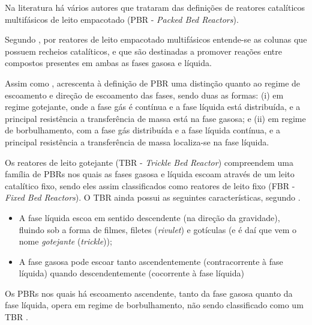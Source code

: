 Na literatura há vários autores que trataram das definições de
reatores catalíticos multifásicos de leito empacotado (PBR - \emph{Packed Bed
Reactors}).

Segundo , por reatores de leito empacotado multifásicos
entende-se as colunas que possuem recheios catalíticos, e que são destinadas a
promover reações entre compostos presentes em ambas as fases gasosa e líquida.

Assim como ,  acrescenta à
definição de PBR uma distinção quanto ao regime de escoamento e direção de
escoamento das fases, sendo duas as formas: (i) em regime gotejante, onde a fase
gás é contínua e a fase líquida está distribuída, e a principal resistência a
transferência de massa está na fase gasosa; e (ii) em regime de borbulhamento,
com a fase gás distribuída e a fase líquida contínua, e a principal resistência
a transferência de massa localiza-se na fase líquida.

Os reatores de leito gotejante (TBR - \emph{Trickle Bed Reactor}) compreendem
uma família de PBRs nos quais as fases gasosa e líquida escoam através de um
leito catalítico fixo, sendo eles assim classificados como reatores de leito
fixo (FBR - \emph{Fixed Bed Reactors}). O TBR ainda possui as seguintes
características, segundo .

\begin{itemize}
\item A fase líquida escoa em sentido descendente (na direção da gravidade),
fluindo sob a forma de filmes, filetes (\emph{rivulet}) e gotículas (e é daí
que vem o nome \textit{gotejante} (\emph{trickle}));
\item A fase gasosa pode escoar tanto ascendentemente (contracorrente à
fase líquida) quando descendentemente (cocorrente à fase líquida)
\end{itemize}

Os PBRs nos quais há escoamento ascendente, tanto da fase gasosa quanto da
fase líquida, opera em regime de borbulhamento, não sendo classificado como
um TBR \cite{Ancheyta2011}.



